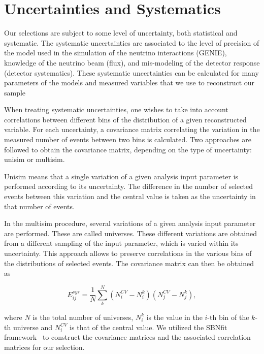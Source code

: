 \section{Uncertainties and Systematics}
\label{sec:systematics}

Our selections are subject to some level of uncertainty, both statistical and systematic. 
The systematic uncertainties are associated to the level of precision of the model used in the simulation of the neutrino interactions (GENIE), knowledge of the neutrino beam (flux), and mis-modeling of the detector response (detector systematics). 
These systematic uncertainties can be calculated for many parameters of the models and measured variables that we use to reconstruct our sample

When treating systematic uncertainties, one wishes to take into account correlations between different bins of the distribution of a given reconstructed variable. For each uncertainty, a covariance matrix correlating the variation in the measured number of events between two bins is calculated. Two approaches are followed to obtain the covariance matrix, depending on the type of uncertainty: unisim or multisim.

Unisim means that a single variation of a given analysis input parameter is performed according to its uncertainty. The difference in the number of selected events between this variation and the central value is taken as the uncertainty in that number of events.

In the multisim procedure, several variations of a given analysis input parameter are performed. These are called universes. These different variations are obtained from a different sampling of the input parameter, which is varied within its uncertainty.
This approach allows to preserve correlations in the various bins of the distributions of selected events. 
The covariance matrix can then be obtained as

\begin{equation}
    E_{ij}^{sys} = \frac{1}{N}\sum_{k}^N (N_i^{CV} - N_i^k)(N_j^{CV} - N_j^k) ,
    \label{eqn:covmatrix}
\end{equation}

where $N$ is the total number of universes, $N_i^k$ is the value in the
$i$-th bin of the $k$-th universe and $N_i^{CV}$ is that of the central value. We utilized the SBNfit framework~\cite{bib:sbnfitgit} to construct the covariance matrices and the associated correlation matrices for our selection.

